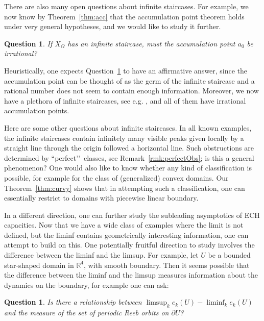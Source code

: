 \documentclass[11pt, reqno]{amsart}
\newtheorem{question}[thm]{Question}
\theoremstyle{remark}
\numberwithin{equation}{subsection}
\numberwithin{figure}{section}
\theoremstyle{customremark}
\newcommand{\Om}{{\Omega}}
\begin{document}
There are also many open questions about infinite staircases.  For example, we now know by Theorem~\ref{thm:acc} that the accumulation point theorem holds under very general hypotheses, and we would like to study it further. 
\begin{question}
\label{que:accum}
If $X_\Om$ has an infinite staircase, must the accumulation point $a_0$ be irrational?
\end{question}

Heuristically, one expects Question~\ref{que:accum} to have an affirmative answer, since the accumulation point can be thought of as the germ of the infinite staircase and a rational number does not seem to contain enough information.  Moreover, we now have a plethora of infinite staircases, see e.g. \cite{AADT, MPW}, and all of them have irrational accumulation points.

Here are some other questions about infinite staircases.
 In all known examples, the infinite staircases contain infinitely many visible peaks given locally by a straight line through the origin followed a horizontal line.  Such obstructions are 
 determined by ``perfect\rq\rq\, classes, see Remark~\ref{rmk:perfectObs}; is this a general phenomenon?  One would also like to know 
whether  any kind of classification is possible, for example for the class of (generalized) convex domains.  Our Theorem~\ref{thm:curvy} shows that in attempting such a classification, one can essentially restrict to domains with piecewise linear boundary.

In a different direction, one can further study the subleading asymptotics of ECH capacities.  Now that we have a wide class of examples where the limit is not defined, but the liminf contains geometrically interesting information, one can attempt to build on this.  One potentially fruitful direction to study involves the difference between the liminf and the limsup.   For example, let $U$ be a bounded star-shaped domain in $\mathbb{R}^4$, with smooth boundary.  Then it seems possible that the difference between the liminf and the limsup measures information about the dynamics on the boundary, for example one can ask:

\begin{question}
\label{que:ivrii}
Is there a relationship between $\limsup_k e_k(U) - \liminf_k e_k(U)$ and the measure of the set of periodic Reeb orbits on $\partial U$?
\end{question}   
\end{document}
